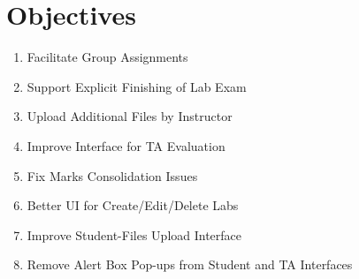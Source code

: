 \section{Objectives}
\begin{enumerate}
\item Facilitate Group Assignments
\item Support Explicit Finishing of Lab Exam
\item Upload Additional Files by Instructor
\item Improve Interface for TA Evaluation
\item Fix Marks Consolidation Issues
\item Better UI for Create/Edit/Delete Labs
\item Improve Student-Files Upload Interface
\item Remove Alert Box Pop-ups from Student and TA Interfaces
\end{enumerate}


